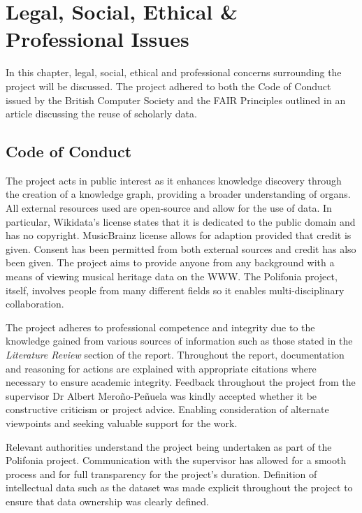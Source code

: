 \chapter{Legal, Social, Ethical \& Professional Issues} 
In this chapter, legal, social, ethical and professional concerns surrounding the project will be discussed. The project adhered to both the Code of Conduct issued by the British Computer Society \cite{bcs} and the FAIR Principles \cite{fairprinciples} outlined in an article discussing the reuse of scholarly data.

\section{Code of Conduct}
\hspace{0.5cm} The project acts in public interest as it enhances knowledge discovery through the creation of a knowledge graph, providing a broader understanding of organs. All external resources used are open-source and allow for the use of data. In particular, Wikidata's license states that it is dedicated to the public domain and has no copyright. MusicBrainz license allows for adaption provided that credit is given. Consent has been permitted from both external sources and credit has also been given. The project aims to provide anyone from any background with a means of viewing musical heritage data on the WWW. The Polifonia project, itself, involves people from many different fields so it enables multi-disciplinary collaboration.  

The project adheres to professional competence and integrity due to the knowledge gained from various sources of information such as those stated in the \textit{Literature Review} section of the report. Throughout the report, documentation and reasoning for actions are explained with appropriate citations where necessary to ensure academic integrity. Feedback throughout the project from the supervisor Dr Albert Mero{\~n}o-Pe{\~n}uela was kindly accepted whether it be constructive criticism or project advice. Enabling consideration of alternate viewpoints and seeking valuable support for the work. 

Relevant authorities understand the project being undertaken as part of the Polifonia project. Communication with the supervisor has allowed for a smooth process and for full transparency for the project's duration. Definition of intellectual data such as the dataset was made explicit throughout the project to ensure that data ownership was clearly defined.

